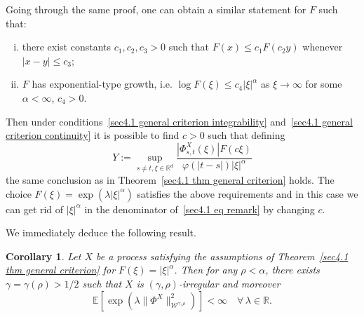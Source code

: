 \documentclass[10pt]{article}
\newcommand{\assign}{:=}
\newenvironment{enumerateroman}{\begin{enumerate}[i.] }{\end{enumerate}}
\newtheorem{corollary}[theorem]{Corollary}
\begin{document}
\begin{remark}
  \label{sec4.1 remark general criterion}Going through the same proof, one can
  obtain a similar statement for $F$ such that:
  \begin{enumerateroman}
    \item there exist constants $c_1, c_2, c_3 > 0$ such that $F (x) \leqslant
    c_1 F (c_2 y)$ whenever $| x - y | \leqslant c_3$;
    
    \item $F$ has exponential\mbox{-}type growth, i.e. $\log F (\xi) \leqslant
    c_4 | \xi |^{\alpha}$ as $\xi \rightarrow \infty$ for some $\alpha <
    \infty$, $c_4 > 0$.
  \end{enumerateroman}
  Then under conditions~{\eqref{sec4.1 general criterion integrability}}
  and~{\eqref{sec4.1 general criterion continuity}} it is possible to find $c
  > 0$ such that defining
  \begin{equation}
    Y \assign \sup_{s \neq t, \xi \in \mathbb{R}^d} \frac{| \Phi^X_{s, t}
    (\xi) | F (c \xi)}{\varphi (| t - s |)  | \xi |^{\alpha}} \label{sec4.1 eq
    remark}
  \end{equation}
  the same conclusion as in Theorem~\ref{sec4.1 thm general criterion} holds.
  The choice $F (\xi) = \exp (\lambda | \xi |^{\alpha})$ satisfies the above
  requirements and in this case we can get rid of $| \xi |^{\alpha}$ in the
  denominator of~{\eqref{sec4.1 eq remark}} by changing $c$.
\end{remark}

We immediately deduce the following result.

\begin{corollary}
  \label{sec4.1 corollary exp integr rho}Let $X$ be a process satisfying the
  assumptions of Theorem~\ref{sec4.1 thm general criterion} for $F (\xi) = |
  \xi |^{\alpha}$. Then for any $\rho < \alpha$, there exists $\gamma = \gamma
  (\rho) > 1 / 2$ such that $X$ is $(\gamma, \rho)$-irregular and moreover
  \begin{equation}
    \mathbb{E} [\exp (\lambda \| \Phi^X \|_{\mathcal{W}^{\gamma, \rho}}^2)^{}]
    < \infty \quad \forall \, \lambda \in \mathbb{R}. \label{sec4.1 exp integr
    rho irr}
  \end{equation}
\end{corollary}
\end{document}
